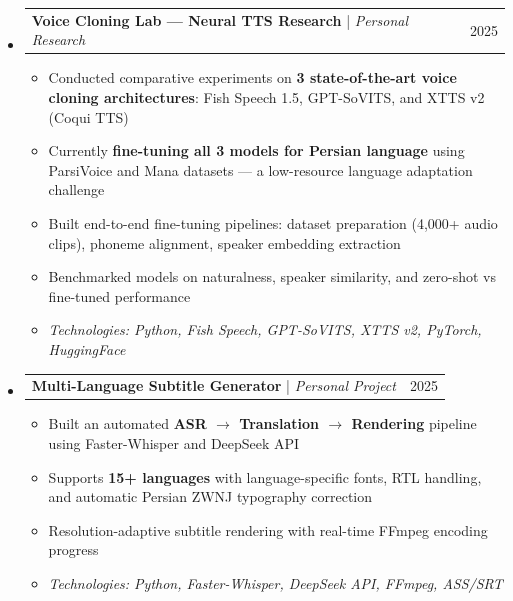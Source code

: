\documentclass[11pt,a4paper]{article}
\makeatletter
\newcommand{\subspace}{\vspace{0.5em}}
\newcommand{\headerrow}[2]{
    \begin{tabular*}{\linewidth}{l@{\extracolsep{\fill}}r}
    #1 & \textcolor{primary}{#2} \\
    \end{tabular*}
}
\makeatother
\begin{document}
\begin{itemize}[leftmargin=1em, label={}]
    \subspace
    \item
    \headerrow{\textbf{Voice Cloning Lab — Neural TTS Research} | \emph{Personal Research}}{2025}
    \begin{itemize}[leftmargin=1.5em, label=$\bullet$, nosep]
        \item Conducted comparative experiments on \textbf{3 state-of-the-art voice cloning architectures}: Fish Speech 1.5, GPT-SoVITS, and XTTS v2 (Coqui TTS)
        \item Currently \textbf{fine-tuning all 3 models for Persian language} using ParsiVoice and Mana datasets — a low-resource language adaptation challenge
        \item Built end-to-end fine-tuning pipelines: dataset preparation (4,000+ audio clips), phoneme alignment, speaker embedding extraction
        \item Benchmarked models on naturalness, speaker similarity, and zero-shot vs fine-tuned performance
        \item \emph{Technologies: Python, Fish Speech, GPT-SoVITS, XTTS v2, PyTorch, HuggingFace}
    \end{itemize}

    \subspace 
    \item
    \headerrow{\textbf{Multi-Language Subtitle Generator} | \emph{Personal Project}}{2025}
    \begin{itemize}[leftmargin=1.5em, label=$\bullet$, nosep]
        \item Built an automated \textbf{ASR $\rightarrow$ Translation $\rightarrow$ Rendering} pipeline using Faster-Whisper and DeepSeek API
        \item Supports \textbf{15+ languages} with language-specific fonts, RTL handling, and automatic Persian ZWNJ typography correction
        \item Resolution-adaptive subtitle rendering with real-time FFmpeg encoding progress
        \item \emph{Technologies: Python, Faster-Whisper, DeepSeek API, FFmpeg, ASS/SRT}
    \end{itemize}
\end{itemize}
\end{document}
